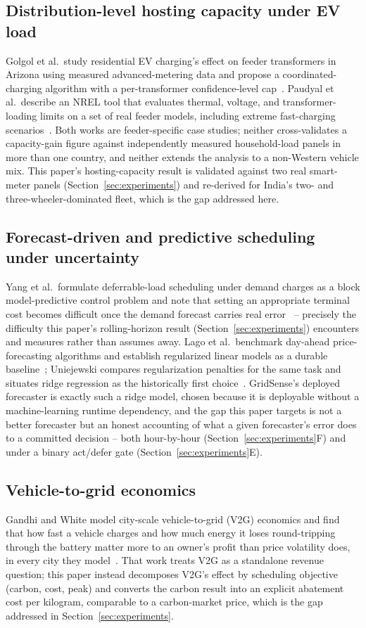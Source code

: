 \documentclass[journal]{IEEEtran}
\begin{document}
\subsection{Distribution-level hosting capacity under EV load}
Golgol et al.\ study residential EV charging's effect on feeder transformers in Arizona using measured advanced-metering data and propose a coordinated-charging algorithm with a per-transformer confidence-level cap~\cite{golgol2024}. Paudyal et al.\ describe an NREL tool that evaluates thermal, voltage, and transformer-loading limits on a set of real feeder models, including extreme fast-charging scenarios~\cite{paudyal2021}. Both works are feeder-specific case studies; neither cross-validates a capacity-gain figure against independently measured household-load panels in more than one country, and neither extends the analysis to a non-Western vehicle mix. This paper's hosting-capacity result is validated against two real smart-meter panels (Section~\ref{sec:experiments}) and re-derived for India's two- and three-wheeler-dominated fleet, which is the gap addressed here.

\subsection{Forecast-driven and predictive scheduling under uncertainty}
Yang et al.\ formulate deferrable-load scheduling under demand charges as a block model-predictive control problem and note that setting an appropriate terminal cost becomes difficult once the demand forecast carries real error~\cite{yang2020bmpc} -- precisely the difficulty this paper's rolling-horizon result (Section~\ref{sec:experiments}) encounters and measures rather than assumes away. Lago et al.\ benchmark day-ahead price-forecasting algorithms and establish regularized linear models as a durable baseline~\cite{lago2021}; Uniejewski compares regularization penalties for the same task and situates ridge regression as the historically first choice~\cite{uniejewski2024}. GridSense's deployed forecaster is exactly such a ridge model, chosen because it is deployable without a machine-learning runtime dependency, and the gap this paper targets is not a better forecaster but an honest accounting of what a given forecaster's error does to a committed decision -- both hour-by-hour (Section~\ref{sec:experiments}F) and under a binary act/defer gate (Section~\ref{sec:experiments}E).

\subsection{Vehicle-to-grid economics}
Gandhi and White model city-scale vehicle-to-grid (V2G) economics and find that how fast a vehicle charges and how much energy it loses round-tripping through the battery matter more to an owner's profit than price volatility does, in every city they model~\cite{gandhi2021v2g}. That work treats V2G as a standalone revenue question; this paper instead decomposes V2G's effect by scheduling objective (carbon, cost, peak) and converts the carbon result into an explicit abatement cost per kilogram, comparable to a carbon-market price, which is the gap addressed in Section~\ref{sec:experiments}.
\end{document}
